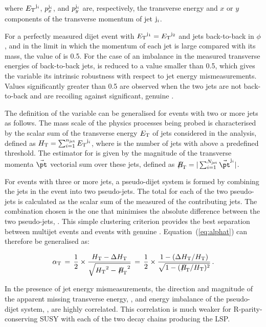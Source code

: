 where ${E_{\text T}}^{{\rm j}_i}$, $p_x^{{\rm j}_i}$, and $p_y^{{\rm j}_i}$ are,
respectively, the transverse energy and $x$ or $y$ components of the
transverse momentum of jet ${\rm j}_i$.

For a perfectly measured dijet event with ${E_{\text T}}^{\rm j_1} = {E_{\text T}}^{\rm
  j_2}$ and jets back-to-back in $\phi$, and in the limit in which the
momentum of each jet is large compared with its mass, the value of
\alphat is 0.5. For the case of an imbalance in the measured
transverse energies of back-to-back jets, \alphat is reduced to a
value smaller than 0.5, which gives the variable its intrinsic
robustness with respect to jet energy mismeasurements. Values
significantly greater than 0.5 are observed when the two jets are not
back-to-back and are recoiling against significant, genuine \met.

The definition of the \alphat variable can be generalised for events
with two or more jets as follows. The mass scale of the physics
processes being probed is characterised by the scalar sum of the
transverse energy ${E_{\text T}}$ of jets considered in the analysis, defined as
$\mbox{$H_\text{T}$} = \sum_{i=1}^{n_{\text{jet}}} {E_{\text T}}^{{\rm j}_i}$, where \njet is the
number of jets with \Et above a predefined threshold. The estimator
for \met is given by the magnitude of the transverse momenta
$\vec{\pt}$ vectorial sum over these jets, defined as $\mht =
|\sum_{i=1}^{N_{\rm jet}} \vec{\pt}^{{\rm j}_i}|$.

For events with three or more jets, a pseudo-dijet system is formed by
combining the jets in the event into two pseudo-jets. The total \Et
for each of the two pseudo-jets is calculated as the scalar sum of the
measured \Et of the contributing jets. The combination chosen is the
one that minimises the absolute \Et difference between the two
pseudo-jets, \dht. This simple clustering criterion provides the best
separation between multijet events and events with genuine
\met. Equation~(\ref{eq:alphat}) can therefore be generalised as:

\begin{equation}
  \label{eq:alphat2}
  \alphat\, = \,\frac{1}{2} \times \frac{\scalht -
    \dht}{\sqrt{\scalht^2 - \mht^2}} \, = \,\frac{1}{2} \times 
  \frac{1 - (\dht/\scalht)}{\sqrt{1 - (\mht/\scalht)^2}} \, . 
\end{equation}

In the presence of jet energy mismeasurements, the direction and
magnitude of the apparent missing transverse energy, \mht, and energy
imbalance of the pseudo-dijet system, \dht, are highly correlated.
This correlation is much weaker for R-parity-conserving SUSY with each
of the two decay chains producing the LSP.

